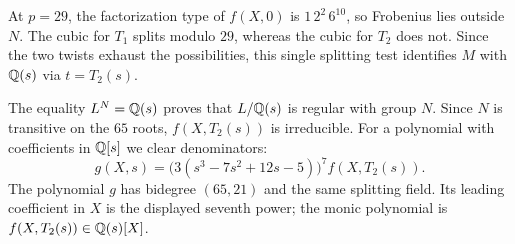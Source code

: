At $p=29$, the factorization type of $f(X,0)$ is $1\,2^2\,6^{10}$, so
Frobenius lies outside $N$. The cubic for $T_1$ splits modulo $29$,
whereas the cubic for $T_2$ does not. Since the two twists exhaust the
possibilities, this single splitting test identifies $M$ with $\mathbb{Q}(s)$
via $t=T_2(s)$.

The equality $L^N=\mathbb{Q}(s)$ proves that $L/\mathbb{Q}(s)$ is regular with group
$N$. Since $N$ is transitive on the $65$ roots, $f(X,T_2(s))$ is
irreducible. For a polynomial with coefficients in $\mathbb{Q}[s]$ we clear
denominators:
\begin{equation}\label{eq:g}
 g(X,s)=\bigl(3(s^3-7s^2+12s-5)\bigr)^7 f(X,T_2(s)).
\end{equation}
The polynomial $g$ has bidegree $(65,21)$ and the same splitting field.
Its leading coefficient in $X$ is the displayed seventh power; the
monic polynomial is $f(X,T_2(s))\in\mathbb{Q}(s)[X]$.

